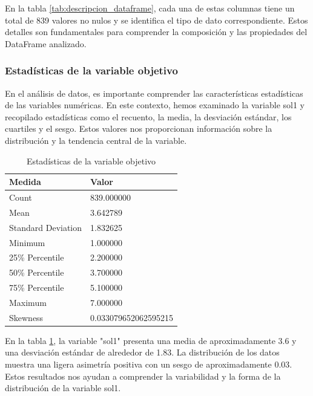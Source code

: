 En la tabla \ref{tab:descripcion_dataframe}, cada una de estas columnas tiene un total de 839 valores no nulos y se identifica el tipo de dato correspondiente. Estos detalles son fundamentales para comprender la composición y las propiedades del DataFrame analizado.

\subsubsection{Estadísticas de la variable objetivo}

En el análisis de datos, es importante comprender las características estadísticas de las variables numéricas. En este contexto, hemos examinado la variable sol1 y recopilado estadísticas como el recuento, la media, la desviación estándar, los cuartiles y el sesgo. Estos valores nos proporcionan información sobre la distribución y la tendencia central de la variable.

\begin{table}[H]
    \centering
    \caption{Estadísticas de la variable objetivo}
    \begin{tabular}{ll}
        \hline
        \textbf{Medida}    & \textbf{Valor}       \\
        \hline
        Count              & 839.000000           \\
        Mean               & 3.642789             \\
        Standard Deviation & 1.832625             \\
        Minimum            & 1.000000             \\
        25\% Percentile    & 2.200000             \\
        50\% Percentile    & 3.700000             \\
        75\% Percentile    & 5.100000             \\
        Maximum            & 7.000000             \\
        Skewness           & 0.033079652062595215 \\
        \hline
    \end{tabular}%
    \label{tab:estadistica_variable_sol1}%
\end{table}%

En la tabla \ref{tab:estadistica_variable_sol1}, la variable "sol1" presenta una media de aproximadamente 3.6 y una desviación estándar de alrededor de 1.83. La distribución de los datos muestra una ligera asimetría positiva con un sesgo de aproximadamente 0.03. Estos resultados nos ayudan a comprender la variabilidad y la forma de la distribución de la variable sol1.

